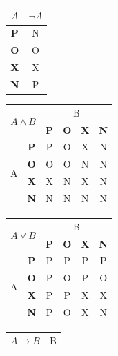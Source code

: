 \documentclass[11pt, a4paper]{article}
\begin{document}
\begin{table}[h]
    \centering
    \begin{tabular}{|c|c|}
        \hline
        $A$ & $\neg A$  \\
        \hline
         \textbf{P}& N \\
         \hline
         \textbf{O}& O \\
         \hline
         \textbf{X} & X \\
         \hline
         \textbf{N} & P \\
         \hline
    \end{tabular}
    \begin{tabular}{|c|c|c|c|c|c|}
    \hline
        \multicolumn{2}{|c|}{\multirow{2}{*}{\bfseries $A \wedge B$}} &
        \multicolumn{4}{|c|}{B}\\
        \cline{3-6}
         \multicolumn{2}{|c|}{} & \textbf{P} & \textbf{O} & \textbf{X} & \textbf{N} \\
         \hline
         \multirow{4}{*}{A} & \textbf{P} & P & O & X & N\\
         \cline{2-6}
         & \textbf{O} & O & O & N & N\\
         \cline{2-6}
         & \textbf{X} & X & N & X & N\\
         \cline{2-6}
         & \textbf{N} & N & N & N & N\\
         \cline{1-6}
    \end{tabular}
    \begin{tabular}{|c|c|c|c|c|c|}
    \hline
        \multicolumn{2}{|c|}{\multirow{2}{*}{\bfseries $A \lor B$}} &
        \multicolumn{4}{|c|}{B}\\
        \cline{3-6}
         \multicolumn{2}{|c|}{} & \textbf{P} & \textbf{O} & \textbf{X} & \textbf{N} \\
         \hline
         \multirow{4}{*}{A} & \textbf{P} & P & P & P & P\\
         \cline{2-6}
         & \textbf{O} & P & O & P & O\\
         \cline{2-6}
         & \textbf{X} & P & P & X & X\\
         \cline{2-6}
         & \textbf{N} & P & O & X & N\\
         \cline{1-6}
    \end{tabular}
    \begin{tabular}{|c|c|c|c|c|c|}
    \hline
        \multicolumn{2}{|c|}{\multirow{2}{*}{\bfseries $A \to B$}} &
        \multicolumn{4}{|c|}{B}\\

\end{tabular}
\end{table}
\end{document}
